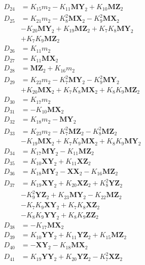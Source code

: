 \begin{multicols}{2}
\begin{align}
D_{24} &= K_{15}m_2 - K_{11}\mathbf{MY}_2 + K_{10}\mathbf{MZ}_2 \nonumber \\
D_{25} &= K_{21}m_2 - K_{8}^2\mathbf{MX}_2 - K_{9}^2\mathbf{MX}_2  \nonumber \\
&- K_{20}\mathbf{MY}_2 + K_{19}\mathbf{MZ}_2 + K_{7}K_{8}\mathbf{MY}_2  \nonumber \\
&+ K_{7}K_{9}\mathbf{MZ}_2 \nonumber \\
D_{26} &= K_{11}m_2 \nonumber \\
D_{27} &= K_{11}\mathbf{MX}_2 \nonumber \\
D_{28} &= \mathbf{MZ}_2 + K_{16}m_2 \nonumber \\
D_{29} &= K_{22}m_2 - K_{7}^2\mathbf{MY}_2 - K_{9}^2\mathbf{MY}_2  \nonumber \\
&+ K_{20}\mathbf{MX}_2 + K_{7}K_{8}\mathbf{MX}_2 + K_{8}K_{9}\mathbf{MZ}_2 \nonumber \\
D_{30} &= K_{17}m_2 \nonumber \\
D_{31} &= -K_{10}\mathbf{MX}_2 \nonumber \\
D_{32} &= K_{18}m_2 - \mathbf{MY}_2 \nonumber \\
D_{33} &= K_{23}m_2 - K_{7}^2\mathbf{MZ}_2 - K_{8}^2\mathbf{MZ}_2  \nonumber \\
&- K_{19}\mathbf{MX}_2 + K_{7}K_{9}\mathbf{MX}_2 + K_{8}K_{9}\mathbf{MY}_2 \nonumber \\
D_{34} &= K_{17}\mathbf{MY}_2 - K_{11}\mathbf{MZ}_2 \nonumber \\
D_{35} &= K_{10}\mathbf{XY}_2 + K_{11}\mathbf{XZ}_2 \nonumber \\
D_{36} &= K_{18}\mathbf{MY}_2 - \mathbf{XX}_2 - K_{16}\mathbf{MZ}_2 \nonumber \\
D_{37} &= K_{19}\mathbf{XY}_2 + K_{20}\mathbf{XZ}_2 + K_{8}^2\mathbf{YZ}_2  \nonumber \\
&- K_{9}^2\mathbf{YZ}_2 + K_{23}\mathbf{MY}_2 - K_{22}\mathbf{MZ}_2  \nonumber \\
&- K_{7}K_{9}\mathbf{XY}_2 + K_{7}K_{8}\mathbf{XZ}_2  \nonumber \\
&- K_{8}K_{9}\mathbf{YY}_2 + K_{8}K_{9}\mathbf{ZZ}_2 \nonumber \\
D_{38} &= -K_{17}\mathbf{MX}_2 \nonumber \\
D_{39} &= K_{10}\mathbf{YY}_2 + K_{11}\mathbf{YZ}_2 + K_{15}\mathbf{MZ}_2 \nonumber \\
D_{40} &= - \mathbf{XY}_2 - K_{18}\mathbf{MX}_2 \nonumber \\
D_{41} &= K_{19}\mathbf{YY}_2 + K_{20}\mathbf{YZ}_2 - K_{7}^2\mathbf{XZ}_2  \nonumber \\

\end{align}
\end{multicols}
